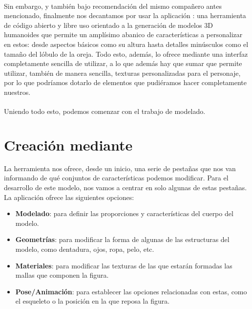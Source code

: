\documentclass{subfiles}
\begin{document}
    \paragraph{}
    Sin embargo, y también bajo recomendación del mismo compañero antes mencionado, finalmente nos decantamos por usar la aplicación \makehuman \cite{web:makehuman}: una herramienta de código abierto y libre uso orientado a la generación de modelos 3D humanoides que permite un amplísimo abanico de características a personalizar en estos: desde aspectos básicos como su altura hasta detalles minúsculos como el tamaño del lóbulo de la oreja. Todo esto, además, lo ofrece mediante una interfaz completamente sencilla de utilizar, a lo que además hay que sumar que permite utilizar, también de manera sencilla, texturas personalizadas para el personaje, por lo que podríamos dotarlo de elementos que pudiéramos hacer completamente nuestros.

    \paragraph{}
    Uniendo todo esto, podemos comenzar con el trabajo de modelado.

    \section{Creación mediante \makehuman}
    \label{sec:4.1}

    La herramienta \makehuman nos ofrece, desde un inicio, una serie de pestañas que nos van informando de qué conjuntos de características podemos modificar. Para el desarrollo de este modelo, nos vamos a centrar en solo algunas de estas pestañas. La aplicación ofrece las siguientes opciones:

    \begin{itemize}
        \item \textbf{Modelado}: para definir las proporciones y características del cuerpo del modelo.
        \item \textbf{Geometrías}: para modificar la forma de algunas de las estructuras del modelo, como dentadura, ojos, ropa, pelo, etc.
        \item \textbf{Materiales}: para modificar las texturas de las que estarán formadas las mallas que componen la figura.
        \item \textbf{Pose/Animación}: para establecer las opciones relacionadas con estas, como el esqueleto o la posición en la que reposa la figura.
    \end{itemize}
\end{document}

